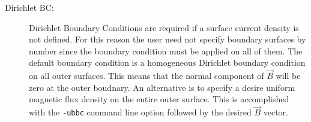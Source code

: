 \documentclass{article}
\begin{document}
\begin{description}
\item[Dirichlet BC:] Dirichlet Boundary Conditions are required if a
  surface current density is not defined.  For this reason the user
  need not specify boundary surfaces by number since the boundary
  condition must be applied on all of them.  The default boundary
  condition is a homogeneous Dirichlet boundary condition on all outer
  surfaces.  This means that the normal component of $\vec{B}$ will be
  zero at the outer boudnary.  An alternative is to specify a desire
  uniform magnetic flux density on the entire outer surface.  This is
  accomplished with the {\tt -ubbc} command line option followed by
  the desired $\vec{B}$ vector.
\end{description}
\end{document}
